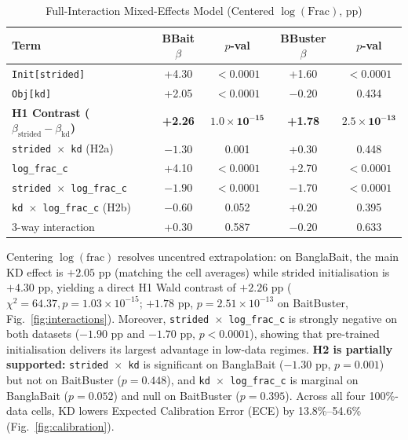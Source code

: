 \documentclass[conference]{IEEEtran}
\begin{document}
\begin{table}[htbp]
\caption{Full-Interaction Mixed-Effects Model (Centered $\log(\text{Frac})$, pp)}
\label{tab:lmm}
\begin{center}
\begin{tabular}{lcccc}
\toprule
\textbf{Term} & \textbf{BBait $\beta$} & \textbf{$p$-val} & \textbf{BBuster $\beta$} & \textbf{$p$-val} \\
\midrule
\texttt{Init[strided]} & +4.30 & $<0.0001$ & +1.60 & $<0.0001$ \\
\texttt{Obj[kd]} & +2.05 & $<0.0001$ & $-0.20$ & 0.434 \\
\textbf{H1 Contrast ($\beta_{\text{strided}} - \beta_{\text{kd}}$)} & \textbf{+2.26} & $\mathbf{1.0\times10^{-15}}$ & \textbf{+1.78} & $\mathbf{2.5\times10^{-13}}$ \\
\texttt{strided $\times$ kd} (H2a) & $-1.30$ & 0.001 & +0.30 & 0.448 \\
\texttt{log\_frac\_c} & +4.10 & $<0.0001$ & +2.70 & $<0.0001$ \\
\texttt{strided $\times$ log\_frac\_c} & $-1.90$ & $<0.0001$ & $-1.70$ & $<0.0001$ \\
\texttt{kd $\times$ log\_frac\_c} (H2b) & $-0.60$ & 0.052 & +0.20 & 0.395 \\
3-way interaction & +0.30 & 0.587 & $-0.20$ & 0.633 \\
\bottomrule
\end{tabular}
\end{center}
\end{table}

Centering $\log(\text{frac})$ resolves uncentred extrapolation: on BanglaBait, the main KD effect is $+2.05$ pp (matching the cell averages) while strided initialisation is $+4.30$ pp, yielding a direct H1 Wald contrast of $+2.26$ pp ($\chi^2=64.37, p=1.03\times10^{-15}$; $+1.78$ pp, $p=2.51\times10^{-13}$ on BaitBuster, Fig.~\ref{fig:interactions}). Moreover, \texttt{strided $\times$ log\_frac\_c} is strongly negative on both datasets ($-1.90$ pp and $-1.70$ pp, $p<0.0001$), showing that pre-trained initialisation delivers its largest advantage in low-data regimes. \textbf{H2 is partially supported:} \texttt{strided $\times$ kd} is significant on BanglaBait ($-1.30$ pp, $p=0.001$) but not on BaitBuster ($p=0.448$), and \texttt{kd $\times$ log\_frac\_c} is marginal on BanglaBait ($p=0.052$) and null on BaitBuster ($p=0.395$). Across all four 100\%-data cells, KD lowers Expected Calibration Error (ECE) by 13.8\%--54.6\% (Fig.~\ref{fig:calibration}).
\end{document}
